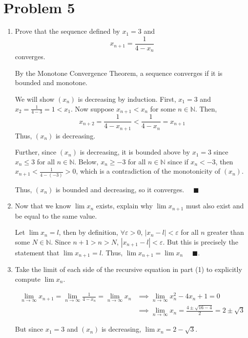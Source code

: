 \documentclass[10pt]{article}
\newcommand{\qed}{\quad \blacksquare}
\newcommand{\abs}[1]{\left\vert #1 \right\vert}
\newcommand{\ep}{\varepsilon}
\newcommand{\N}{\mathbb{N}}
\begin{document}
\pagebreak
\section*{Problem 5}
\begin{enumerate}
	\item Prove that the sequence defined by $x_1=3$ and 
	\begin{equation*}
		x_{n+1}=\frac{1}{4-x_n}
	\end{equation*}
	converges.

        \color{blue}
            By the Monotone Convergence Theorem, a sequence converges if it is bounded and monotone. 

            We will show $(x_n)$ is decreasing by induction. First, $x_1 = 3$ and $x_2 = \frac{1}{4 - 3} = 1 < x_1$. Now suppose $x_{n +1} < x_n$ for some $n \in \N$. Then, 
            \[x_{n+2} = \frac{1}{4 - x_{n+1}} < \frac{1}{4 - x_n} = x_{n+1}\] 
            Thus, $(x_n)$ is decreasing.
    
            Further, since $(x_n)$ is decreasing, it is bounded above by $x_1 = 3$ since $x_n \leq 3$ for all $n \in \N$. Below, $x_n \geq -3$ for all $n \in \N$ since if $x_n < -3$, then $x_{n+1} < \frac{1}{4 - (-3)} > 0$, which is a contradiction of the monotonicity of $(x_n)$.
            
            Thus, $(x_n)$ is bounded and decreasing, so it converges. $\qed$ 
        \color{black}

	\item Now that we know $\lim x_n$ exists, explain why $\lim x_{n+1}$ must also exist and be equal to the same value.
	
        \color{blue}
            Let $\lim x_n = l$, then by definition, $\forall \ep > 0$, $\abs{x_n - l} < \ep$ for all $n$ greater than some $N \in \N$. Since $n + 1 > n > N$, $\abs{x_{n + 1} - l} < \ep$. But this is precisely the statement that $\lim x_{n+1} = l$. Thus, $\lim x_{n+1} = \lim x_n$ $\qed$.          
        \color{black}

	\item Take the limit of each side of the recursive equation in part (1) to explicitly compute $\lim x_n$.
	
    \color{blue}
        \begin{align*}
            \lim_{n\to \infty} x_{n+1} = \lim_{n\to \infty} \frac{1}{4 - x_n} = \lim_{n\to \infty} x_n &\implies \lim_{n\to \infty} x_n^2 - 4x_n + 1 = 0\\ 
            &\implies \lim_{n\to \infty} x_n = \frac{4 \pm \sqrt{16 - 4}}{2} = 2 \pm \sqrt{3}
        \end{align*}

        But since $x_1 = 3$ and $(x_n)$ is decreasing, $\boxed{\lim x_n = 2 - \sqrt{3}}$.
    \color{black}
\end{enumerate}
\end{document}
